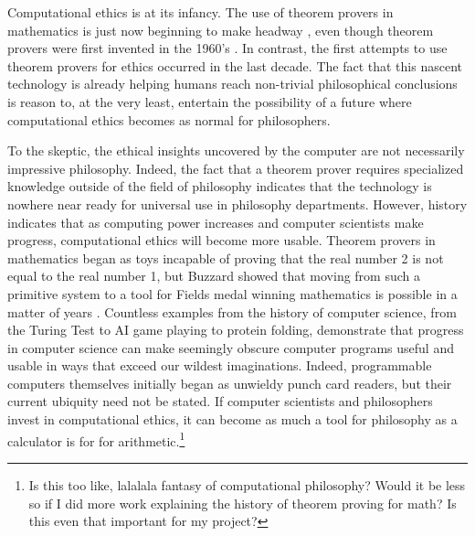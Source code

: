 \begin{isabellebody}
\begin{isamarkuptext}
{Just as calculators make arithmetic more accessible, computational ethics does the same for formal philosophy. 
Not all philosophy can or will 
be formalized or automated—after all, calculators didn't make accountants or mathematicians obsolete. Just as computers 
reduce the tedium in other aspects of our life, they can reduce the tedium involved in formal logic to 
allow mathematicians and philosophers to focus their attention on understanding.%
\end{isamarkuptext}\isamarkuptrue%
%
\isadelimdocument
%
\endisadelimdocument
%
\isatagdocument
%
\isamarkuptrue%
%
\endisatagdocument
{\isafolddocument}%
%
\isadelimdocument
%
\endisadelimdocument
%
\begin{isamarkuptext}%
Computational ethics is at its infancy. The use of theorem provers in mathematics is just now beginning 
to make headway \cite{buzzardvideo}, even though theorem provers were first invented in the 1960's \cite{historyofITP}. In contrast, the first attempts to use theorem 
provers for ethics occurred in the last decade. The fact that this nascent technology is already 
helping humans reach non-trivial philosophical conclusions is reason to, at the very least, entertain 
the possibility of a future where computational ethics becomes as normal for philosophers.

To the skeptic, the ethical insights uncovered by the computer are not necessarily impressive 
philosophy. Indeed, the fact that a theorem prover requires specialized knowledge outside of the field 
of philosophy indicates that the technology is nowhere near ready for universal use in philosophy 
departments. However, history indicates that as computing power increases and computer scientists make 
progress, computational ethics will become more usable. Theorem provers in mathematics began as toys 
incapable of proving that the real number 2 is not equal to the real number 1, but Buzzard showed that 
moving from such a primitive system to a tool for Fields medal winning mathematics is possible in a 
matter of years \cite{buzzardvideo}. Countless examples from the history of computer science, from the Turing 
Test to AI game playing to protein folding, demonstrate that progress in computer science can make seemingly 
obscure computer programs useful and usable in ways that exceed our wildest imaginations. Indeed, 
programmable computers themselves initially began as unwieldy punch card readers, but their current ubiquity 
need not be stated. If computer scientists and philosophers invest in computational ethics, it can 
become as much a tool for philosophy as a calculator is for for arithmetic.\footnote{Is this too like, 
lalalala fantasy of computational philosophy? Would it be less so if I did more work explaining 
the history of theorem proving for math? Is this even that important for my project?}%
\end{isamarkuptext}\isamarkuptrue%
%
\isadelimtheory
%
\endisadelimtheory
%
\isatagtheory
%
\endisatagtheory
{\isafoldtheory}%
%
\isadelimtheory
%
\endisadelimtheory
%
\end{isabellebody}%

